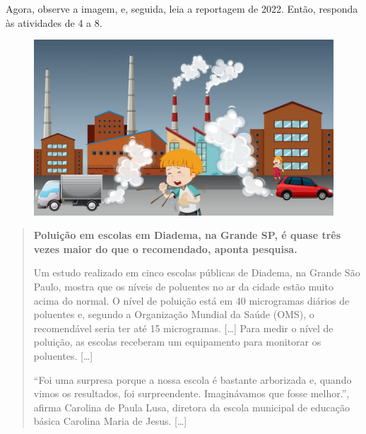 
\noindent{}Agora, observe a imagem, e, seguida, leia a reportagem de 2022. Então, responda às atividades de 4 a 8.

\begin{figure}[htpb!]
\includegraphics[width=\textwidth]{./imgs/img34.png}
\end{figure}

\begin{quote}
\textbf{Poluição em escolas em Diadema, na Grande SP, é quase três vezes maior
do que o recomendado, aponta pesquisa.}

Um estudo realizado em cinco escolas públicas de Diadema, na Grande São
Paulo, mostra que os níveis de poluentes no ar da cidade estão muito
acima do normal. O nível de poluição está em 40 microgramas diários de
poluentes e, segundo a Organização Mundial da Saúde (OMS), o
recomendável seria ter até 15 microgramas. {[}\ldots{}{]} Para medir o nível de
poluição, as escolas receberam um equipamento para monitorar os
poluentes. {[}\ldots{}{]}

“Foi uma surpresa porque a nossa escola é bastante arborizada e, quando
vimos os resultados, foi surpreendente. Imaginávamos que fosse melhor.”,
afirma Carolina de Paula Lusa, diretora da escola municipal de educação
básica Carolina Maria de Jesus. {[}\ldots{}{]}

\end{quote}

